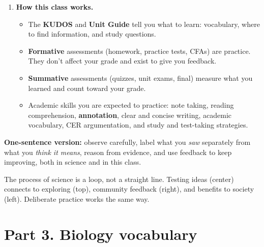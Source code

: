 \documentclass[11pt,letterpaper]{article}
\begin{document}
\begin{enumerate}
  \item \textbf{How this class works.}
  \begin{itemize}
    \item The \textbf{KUDOS} and \textbf{Unit Guide} tell you what to learn: vocabulary, where to find information, and study questions.
    \item \textbf{Formative} assessments (homework, practice tests, CFAs) are practice. They don't affect your grade and exist to give you feedback.
    \item \textbf{Summative} assessments (quizzes, unit exams, final) measure what you learned and count toward your grade.
    \item Academic skills you are expected to practice: note taking, reading comprehension, \textbf{annotation}, clear and concise writing, academic vocabulary, CER argumentation, and study and test-taking strategies.
  \end{itemize}
\end{enumerate}

\textbf{One-sentence version:} observe carefully, label what you \emph{saw} separately from what you \emph{think it means}, reason from evidence, and use feedback to keep improving, both in science and in this class.

  {The process of science is a loop, not a straight line. Testing ideas (center) connects to exploring (top), community feedback (right), and benefits to society (left). Deliberate practice works the same way.}

\section{Part 3. Biology vocabulary}
\end{document}
